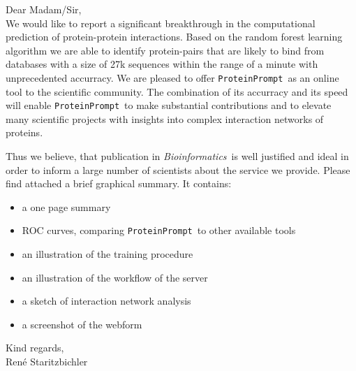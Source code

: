\documentclass{article}
\newcommand{\tool}{\texttt{ProteinPrompt}}
\newcommand{\jrn}{\textit{Bioinformatics}}
\begin{document}
Dear Madam/Sir,\\

We would like to report a significant breakthrough in the computational prediction of protein-protein interactions.
Based on the random forest learning algorithm we are able to identify protein-pairs that are likely to bind from databases with a size of 27k sequences within the range of a minute with unprecedented accurracy.
We are pleased to offer \tool\ as an online tool to the scientific community.
The combination of its accurracy and its speed will enable \tool\ to make substantial contributions and to  elevate many scientific projects with insights into complex interaction networks of proteins. 

Thus we believe, that publication in \jrn\ is well justified and ideal in order to inform a large number of scientists about the service we provide.
Please find attached a brief graphical summary.
It contains:
\begin{itemize}
\item a one page summary
\item ROC curves, comparing \tool\ to other available tools
\item an illustration of the training procedure
\item an illustration of the workflow of the server
\item a sketch of interaction network analysis
\item a screenshot of the webform
\end{itemize}

Kind regards,\\
Ren\'{e} Staritzbichler
\end{document}
